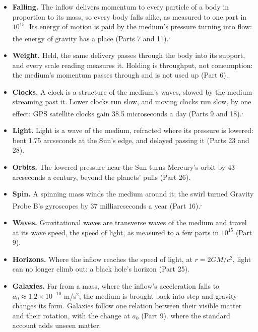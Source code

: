 \begin{itemize}
\item \textbf{Falling.} The inflow delivers momentum to every particle of a body in proportion to its mass, so every body falls alike, as measured to one part in $10^{15}$. Its energy of motion is paid by the medium's pressure turning into flow: the energy of gravity has a place (Parts 7 and 11).\textsuperscript{,}
\item \textbf{Weight.} Held, the same delivery passes through the body into its support, and every scale reading measures it. Holding is throughput, not consumption: the medium's momentum passes through and is not used up (Part 6).
\item \textbf{Clocks.} A clock is a structure of the medium's waves, slowed by the medium streaming past it. Lower clocks run slow, and moving clocks run slow, by one effect: GPS satellite clocks gain 38.5 microseconds a day (Parts 9 and 18).\textsuperscript{,}
\item \textbf{Light.} Light is a wave of the medium, refracted where its pressure is lowered: bent 1.75 arcseconds at the Sun's edge, and delayed passing it (Parts 23 and 28).
\item \textbf{Orbits.} The lowered pressure near the Sun turns Mercury's orbit by 43 arcseconds a century, beyond the planets' pulls (Part 26).
\item \textbf{Spin.} A spinning mass winds the medium around it; the swirl turned Gravity Probe B's gyroscopes by 37 milliarcseconds a year (Part 16).\textsuperscript{,}
\item \textbf{Waves.} Gravitational waves are transverse waves of the medium and travel at its wave speed, the speed of light, as measured to a few parts in $10^{15}$ (Part 9).
\item \textbf{Horizons.} Where the inflow reaches the speed of light, at $r=2GM/c^2$, light can no longer climb out: a black hole's horizon (Part 25).
\item \textbf{Galaxies.} Far from a mass, where the inflow's acceleration falls to $a_0\approx1.2\times10^{-10}$ m/s$^2$, the medium is brought back into step and gravity changes its form. Galaxies follow one relation between their visible matter and their rotation, with the change at $a_0$ (Part 9).  where the standard account adds unseen matter.
\end{itemize}


